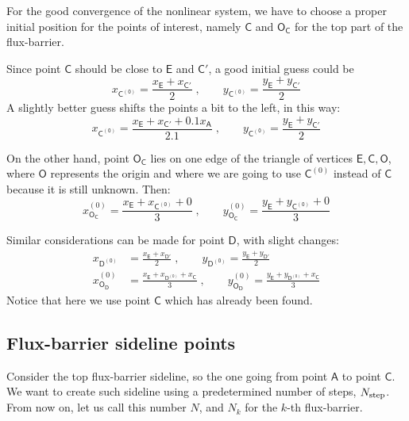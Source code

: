 \documentclass[b5paper,11pt,oneside,fleqn]{article}
\newcommand{\pt}[1]{\mathsf{#1}}
\newcommand{\Nstep}{N_{\textup{step}}}
\begin{document}
For the good convergence of the nonlinear system, we have to choose a proper 
initial position for the points of interest, namely $ \pt{C} $ and 
$ \pt{O}_\pt{C} $ for the top part of the flux-barrier.

Since point $ \pt{C} $ should be close to $ \pt{E} $ and $ \pt{C}' $, 
a good initial guess could be
\begin{equation}
x_\pt{C^{(0)}} = \frac{x_\pt{E} + x_{\pt{C}'}}{2} \;,  \qquad
y_\pt{C^{(0)}} = \frac{y_\pt{E} + y_{\pt{C}'}}{2} 
\end{equation}
A slightly better guess shifts the points a bit to the left, in this way:
\begin{equation}
x_\pt{C^{(0)}} = \frac{x_\pt{E} + x_{\pt{C}'} + 0.1 x_\pt{A}}{2.1} \;,  \qquad
y_\pt{C^{(0)}} = \frac{y_\pt{E} + y_{\pt{C}'}}{2} 
\end{equation}

On the other hand, point $ \pt{O}_\pt{C} $ lies on one edge of the triangle of 
vertices
$ \pt{E},\pt{C},\pt{O} $, where $ \pt{O} $ represents the origin and where we 
are going to use $ \pt{C}^{(0)} $ instead of $ \pt{C} $ because it is still 
unknown. Then:
\begin{equation}
x_\pt{O_\pt{C}}^{(0)} = \frac{x_\pt{E} + x_\pt{C^{(0)}} + 0}{3} \;,  \qquad
y_\pt{O_\pt{C}}^{(0)} = \frac{y_\pt{E} + y_\pt{C^{(0)}} + 0}{3} 
\end{equation}

Similar considerations can be made for point $ \pt{D} $, with slight changes:
\begin{align}
x_\pt{D^{(0)}} &= \frac{x_\pt{E} + x_{\pt{D}'}}{2} \;,  \qquad
y_\pt{D^{(0)}} = \frac{y_\pt{E} + y_{\pt{D}'}}{2}  \\[1ex]
%
x_\pt{O_\pt{D}}^{(0)} &= \frac{x_\pt{E} + x_\pt{D^{(0)}} + x_\pt{C}}{3} 
\;, \qquad
y_\pt{O_\pt{D}}^{(0)} = \frac{y_\pt{E} + y_\pt{D^{(0)}} + x_\pt{C}}{3} 
\end{align}
Notice that here we use point $ \pt{C} $ which has already been found.


\subsection{Flux-barrier sideline points}

Consider the top flux-barrier sideline, so the one going from point $ \pt{A} $ 
to point $ \pt{C} $.
We want to create such sideline using a predetermined number of steps,
$ \Nstep $. From now on, let us call this number $ N $, 
and $ N_k $ for the $ k $-th flux-barrier.
\end{document}
